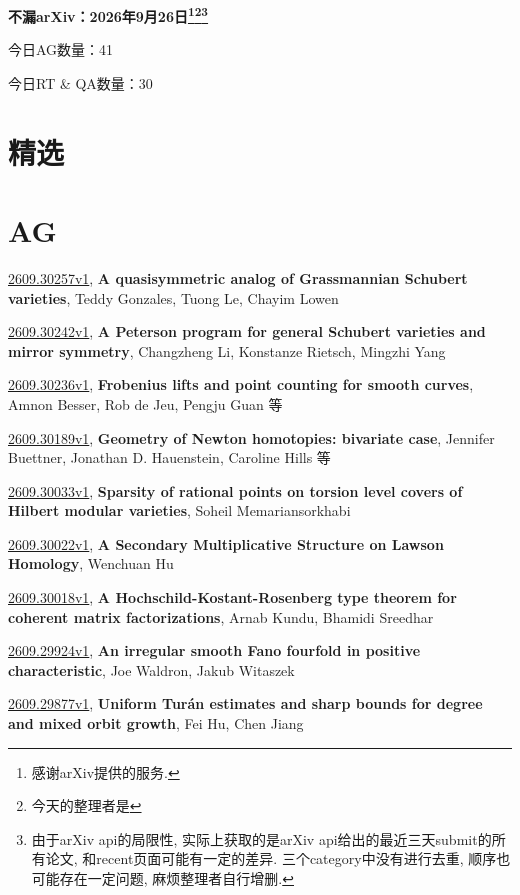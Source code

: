\documentclass[9pt, a4paper]{article}
\theoremstyle{plain}
\theoremstyle{definition}
\theoremstyle{remark}
\newcommand{\arxiv}[3]{\href{https://arxiv.org/abs/#1}{#1}, \textbf{\textcolor{arxivblue}{#2}}, #3}
\newcommand{\AGnumber}{41}
\newcommand{\RTQAnumber}{30}
\newcommand{\NewestDate}{2026年9月26日}
\newcommand{\todayarXiver}{} %
\begin{document}
\begin{center}
    \Huge\textbf{不漏arXiv：\NewestDate\footnote{感谢arXiv提供的服务.}\footnote{今天的整理者是\todayarXiver}\footnote{由于arXiv api的局限性, 实际上获取的是arXiv api给出的最近三天submit的所有论文, 和recent页面可能有一定的差异. 三个category中没有进行去重, 顺序也可能存在一定问题, 麻烦整理者自行增删.}} \\
\end{center}

\setcounter{section}{-1}

\begin{center}
    今日AG数量：\AGnumber
    
    今日RT \& QA数量：\RTQAnumber
    
\end{center}


\section{精选}


\section{AG}
\arxiv{2609.30257v1}{A quasisymmetric analog of Grassmannian Schubert varieties}{Teddy Gonzales, Tuong Le, Chayim Lowen}

\arxiv{2609.30242v1}{A Peterson program for general Schubert varieties and mirror symmetry}{Changzheng Li, Konstanze Rietsch, Mingzhi Yang}

\arxiv{2609.30236v1}{Frobenius lifts and point counting for smooth curves}{Amnon Besser, Rob de Jeu, Pengju Guan 等}

\arxiv{2609.30189v1}{Geometry of Newton homotopies: bivariate case}{Jennifer Buettner, Jonathan D. Hauenstein, Caroline Hills 等}

\arxiv{2609.30033v1}{Sparsity of rational points on torsion level covers of Hilbert modular varieties}{Soheil Memariansorkhabi}

\arxiv{2609.30022v1}{A Secondary Multiplicative Structure on Lawson Homology}{Wenchuan Hu}

\arxiv{2609.30018v1}{A Hochschild-Kostant-Rosenberg type theorem for coherent matrix factorizations}{Arnab Kundu, Bhamidi Sreedhar}

\arxiv{2609.29924v1}{An irregular smooth Fano fourfold in positive characteristic}{Joe Waldron, Jakub Witaszek}

\arxiv{2609.29877v1}{Uniform Turán estimates and sharp bounds for degree and mixed orbit growth}{Fei Hu, Chen Jiang}
\end{document}
